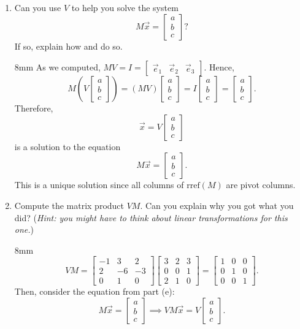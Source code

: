 \documentclass[letter]{article}
\newcommand{\mat}[1]{\begin{bmatrix}#1\end{bmatrix}}
\newcommand{\Rref}{\mathrm{rref}}
\newenvironment{answer}{
	\begin{adjustwidth}{8mm}{} \vspace{2mm}}{\end{adjustwidth} \vspace{2mm}
}
\theoremstyle{plain}
\theoremstyle{definition}
\theoremstyle{remark}
\begin{document}
\begin{enumerate}
\begin{enumerate}
				\item Can you use $V$ to help you solve the system
					\[
						M\vec x=\mat{a\\b\\c}?
					\]
					If so, explain how and do so.
				\begin{answer}
					As we computed, $MV = I = \mat{\vec{e}_1 & \vec{e}_2 & \vec{e}_3}$. Hence, 
					\[
					M(V\mat{a\\b\\c}) = (MV)\mat{a\\b\\c} = I\mat{a\\b\\c} = \mat{a\\b\\c}.
					\]
					Therefore,
					\[
					\vec{x} = V\mat{a\\b\\c}
					\]
					is a solution to the equation
					\[
					M\vec{x} = \mat{a\\b\\c}.
					\]
					This is a unique solution since all columns of $\Rref(M)$ are pivot columns. 
				\end{answer}
				\item Compute the matrix product $VM$.  Can you explain why you got what you did?
					(\emph{Hint: you might have to think about linear transformations for this one.})
				\begin{answer}
					\[
					VM = \left[\begin{array}{ccc}
					-1 & 3 & 2\\
					2 & -6 & -3\\
					0 & 1 & 0
					\end{array}\right]
					\left[\begin{array}{ccc}
					3 & 2 & 3\\
					0 & 0 & 1\\
					2 & 1 & 0
					\end{array}\right] = 
					\left[\begin{array}{ccc}
					1 & 0 & 0\\
					0 & 1 & 0\\
					0 & 0 & 1
					\end{array}\right].
					\]
					Then, consider the equation from part (e):
					\[
					M\vec{x} = \mat{a\\b\\c} \implies VM\vec{x} = V\mat{a\\b\\c}.
\]
\end{answer}
\end{enumerate}
\end{enumerate}
\end{document}
